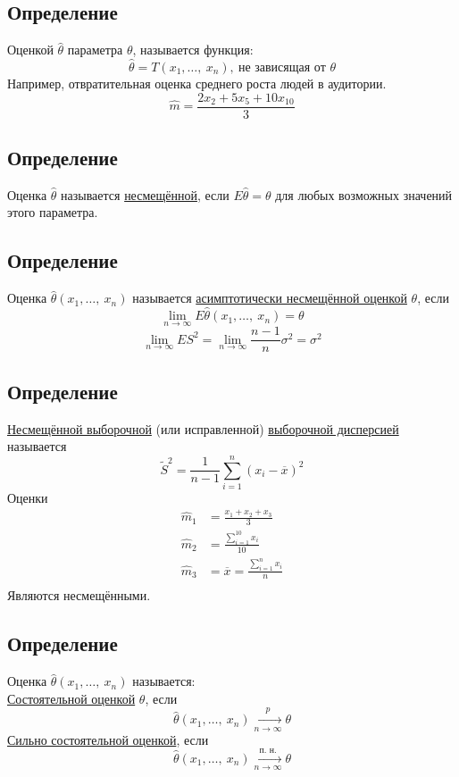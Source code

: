 \documentclass[12pt, a4paper]{article}
\newcommand{\sion}{\sum_{i = 1}^{n}}
\begin{document}
\subsection*{Определение}
Оценкой $\hat{\theta}$ параметра $\theta$, называется функция:
\[\hat{\theta} = T(x_1,\dots,\ x_n),\ \text{не зависящая от $\theta$}\]
Например, отвратительная оценка среднего роста людей в аудитории.
\[\hat{m} = \frac{2x_2 + 5x_5 + 10x_{10}}{3}\]
\subsection*{Определение}
Оценка $\hat{\theta}$ называется \underline{несмещённой}, если $E\hat{\theta} = \theta$ для любых возможных значений этого параметра.
\subsection*{Определение}
Оценка $\hat{\theta}(x_1,\dots,\ x_n)$ называется \underline{асимптотически несмещённой оценкой} $\theta$, если
\[\lim_{n\to\infty} E\hat{\theta}(x_1,\dots,\ x_n) = \theta\]
\[\lim_{n\to\infty} ES^2 = \lim_{n\to\infty} \frac{n - 1}{n}\sigma^2 = \sigma^2\]
\subsection*{Определение}
\underline{Несмещённой выборочной} (или исправленной) \underline{выборочной дисперсией} называется
\[\tilde{S}^2 = \frac{1}{n - 1} \sum_{i = 1}^{n} (x_i - \overline{x})^2\]
Оценки
\[\begin{aligned}
    \hat{m}_1 &= \frac{x_1 + x_2 + x_3}{3}\\
    \hat{m}_2 &= \frac{\sum_{i = 1}^{10} x_i}{10}\\
    \hat{m}_3 &= \overline{x} = \frac{\sion x_i}{n}\\  
\end{aligned}\]
Являются несмещёнными.
\subsection*{Определение}
Оценка $\hat{\theta}(x_1,\dots,\ x_n)$ называется:\\
\underline{Состоятельной оценкой} $\theta$, если
\[\hat{\theta} (x_1,\dots,\ x_n) \xrightarrow[n\to\infty]{p} \theta\]
\underline{Сильно состоятельной оценкой}, если
\[\hat{\theta} (x_1,\dots,\ x_n) \xrightarrow[n\to\infty]{\text{п. н.}} \theta\]
\end{document}
